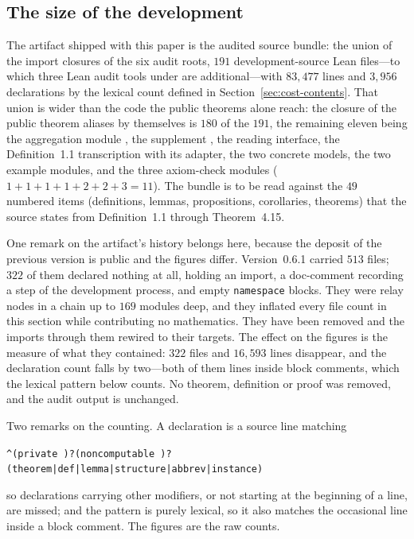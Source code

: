 \documentclass[11pt]{article}
\theoremstyle{definition}
\theoremstyle{remark}
\begin{document}
\subsection{The size of the development}
\label{sec:cost}

The artifact shipped with this paper is the audited source bundle: the union of the import closures of the six audit roots, $191$ development-source Lean files---to which three Lean audit tools under  are additional---with $83{,}477$ lines and $3{,}956$ declarations by the lexical count defined in Section~\ref{sec:cost-contents}.  That union is wider than the code the public theorems alone reach: the closure of the public theorem aliases by themselves is $180$ of the $191$, the remaining eleven being the aggregation module , the supplement , the reading interface, the Definition~1.1 transcription with its adapter, the two concrete models, the two example modules, and the three axiom-check modules ($1+1+1+1+2+2+3=11$).  The bundle is to be read against the $49$ numbered items (definitions, lemmas, propositions, corollaries, theorems) that the source states from Definition~1.1 through Theorem~4.15.

One remark on the artifact's history belongs here, because the deposit of the
previous version is public and the figures differ.  Version~0.6.1 carried $513$
files; $322$ of them declared nothing at all, holding an import, a doc-comment
recording a step of the development process, and empty \texttt{namespace} blocks.
They were relay nodes in a chain up to $169$ modules deep, and they inflated every
file count in this section while contributing no mathematics.  They have been
removed and the imports through them rewired to their targets.  The effect on the
figures is the measure of what they contained: $322$ files and $16{,}593$ lines
disappear, and the declaration count falls by two---both of them lines inside block
comments, which the lexical pattern below counts.  No theorem, definition or proof
was removed, and the audit output is unchanged.

Two remarks on the counting.  A declaration is a source line matching
\begin{center}
\verb!^(private )?(noncomputable )?(theorem|def|lemma|structure|abbrev|instance) !
\end{center}
so declarations carrying other modifiers, or not starting at the beginning of a line, are missed; and the pattern is purely lexical, so it also matches the occasional line inside a block comment.  The figures are the raw counts.
\end{document}
